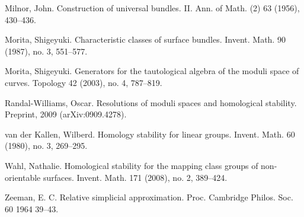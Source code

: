 \documentclass[10pt]{amsart}
\begin{document}
\begin{thebibliography}{21}
 Milnor, John. Construction of universal bundles. II.  Ann. of Math. (2)  63  (1956), 430--436.

 Morita, Shigeyuki.
Characteristic classes of surface bundles. Invent. Math. 90 (1987), no. 3, 551--577. 

 Morita, Shigeyuki.
Generators for the tautological algebra of the moduli space of curves. 
Topology 42 (2003), no. 4, 787--819. 



  Randal-Williams, Oscar. Resolutions of moduli spaces and homological stability. Preprint, 2009 (arXiv:0909.4278).

 van der Kallen, Wilberd. Homology stability for linear groups.  Invent. Math.  60  (1980), no. 3, 269--295. 

 Wahl, Nathalie. Homological stability for the mapping class groups of non-orientable surfaces.  Invent. Math.  171  (2008),  no. 2, 389--424. 


 Zeeman, E. C.
Relative simplicial approximation. Proc. Cambridge Philos. Soc. 60 1964 39--43. 

\end{thebibliography}
\end{document}
